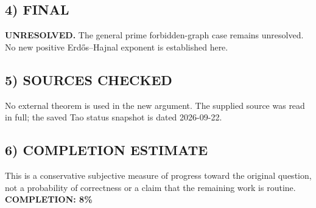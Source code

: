 \subsection{4) FINAL}
\textbf{UNRESOLVED.}
The general prime forbidden-graph case remains unresolved. No new positive Erd\H{o}s--Hajnal exponent is established here.
\subsection{5) SOURCES CHECKED}
No external theorem is used in the new argument. The supplied source was read in full; the saved Tao status snapshot is dated 2026-09-22.
\subsection{6) COMPLETION ESTIMATE}
This is a conservative subjective measure of progress toward the original question, not a probability of correctness or a claim that the remaining work is routine.
\textbf{COMPLETION: 8\%}
